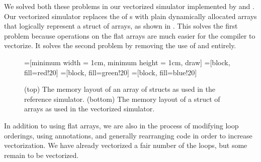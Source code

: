 We solved both these problems in our vectorized simulator implemented by
 and . Our vectorized simulator
replaces the \cppvec{} of \cpparr{}s with plain dynamically allocated arrays
that logically represent a struct of arrays, as shown in .
This solves the first problem because operations on the flat arrays are much
easier for the compiler to vectorize. It solves the second problem by removing
the use of \cppvec{} and \cpparr{} entirely.

\begin{figure}[h]
  \centering
  =[minimum width = 1cm, minimum height = 1cm, draw]
   =[block, fill=red!20]
  =[block, fill=green!20]
  =[block, fill=blue!20]

  \vspace{0.5cm}

  \caption{%
    (top) The memory layout of an array of structs as used in the reference
    simulator. (bottom) The memory layout of a struct of arrays as used in the
    vectorized simulator.
  }\label{fig:vec-to-arr}
\end{figure}

In addition to using flat arrays, we are also in the process of modifying loop
orderings, using  annotations, and generally rearranging
code in order to increase vectorization. We have already vectorized a fair
number of the loops, but some remain to be vectorized.

